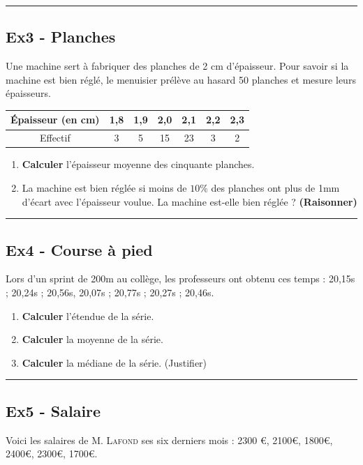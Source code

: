 \documentclass[12pt]{article}
\newcommand{\horrule}[1]{\rule{\linewidth}{#1}} %
\begin{document}
\begin{multicols}{2}
\horrule{1px}
\subsection*{Ex3 - Planches}

Une machine sert à fabriquer des planches de 2 cm d'épaisseur. Pour savoir si la machine est bien réglé, le menuisier prélève au hasard 50 planches et mesure leurs épaisseurs.

\begin{center}
  \begin{tabular}{|c||c|c|c|c|c|c|}
    \hline
    Épaisseur (en cm)   & 1,8 & 1,9 & 2,0 & 2,1 & 2,2 & 2,3 \\
    \hline 
    Effectif & 3 & 5 & 15 & 23 & 3 & 2 \\
    \hline
  \end{tabular}
\end{center}

\begin{enumerate}
\item[1.] \textbf{Calculer} l'épaisseur moyenne des cinquante planches.
\item[2.] La machine est bien réglée si moins de $10\%$ des planches ont plus de 1mm d'écart avec l'épaisseur voulue. La machine est-elle bien réglée ? \textbf{(Raisonner)}
\end{enumerate}

\horrule{1px}
\subsection*{Ex4 - Course à pied}

Lors d'un sprint de 200m au collège, les professeurs ont obtenu ces temps : 20,15s ; 20,24s ; 20,56s, 20,07s ; 20,77s ; 20,27s ; 20,46s.

\begin{enumerate}
\item[1.] \textbf{Calculer} l'étendue de la série.
\item[2.] \textbf{Calculer} la moyenne de la série.
\item[3.] \textbf{Calculer} la médiane de la série. (Justifier)
\end{enumerate}

\horrule{1px}
\subsection*{Ex5 - Salaire}

Voici les salaires de \textsc{M. Lafond} ses six derniers mois : 2300 \euro, 2100\euro, 1800\euro, 2400\euro, 2300\euro, 1700\euro.


\end{multicols}
\end{document}
